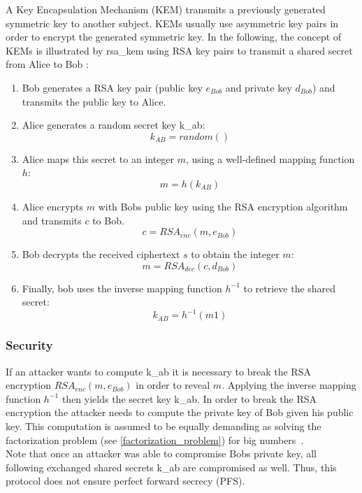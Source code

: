 A Key Encapsulation Mechanism (\gls{KEM}) transmits a previously generated symmetric key to another subject. \glspl{KEM} usually use asymmetric key pairs in order to encrypt the generated symmetric key. In the following, the concept of \glspl{KEM} is illustrated by  \gls{rsa_kem} using \gls{RSA} key pairs to transmit a shared secret from Alice to Bob \parencite{rsakem}:

\begin{enumerate}
\item Bob generates a \gls{RSA} key pair (public key $e_{Bob}$ and private key $d_{Bob}$) and transmits the public key to Alice.
\item Alice generates a random secret key \gls{k_ab}:
\begin{equation*}
k_{AB} = random()
\end{equation*}
\item Alice maps this secret to an integer $m$, using a well-defined mapping function $h$:
\begin{equation*}
m = h(k_{AB})
\end{equation*}
\item Alice encrypts $m$ with Bobs public key using the \gls{RSA} encryption algorithm and transmits $c$ to Bob.
\begin{equation*}
c = RSA_{enc}(m, e_{Bob})
\end{equation*}
\item Bob decrypts the received ciphertext $s$ to obtain the integer $m$:
\begin{equation*}
m = RSA_{dec}(c, d_{Bob})
\end{equation*}
\item Finally, bob uses the inverse mapping function $h^{-1}$ to retrieve the shared secret:
\begin{equation*}
k_{AB} = h^{-1}(m1)
\end{equation*}

\end{enumerate}

\subsubsection{Security}
If an attacker wants to compute \gls{k_ab} it is necessary to break the \gls{RSA} encryption $RSA_{enc}(m, e_{Bob})$ in order to reveal $m$. Applying the inverse mapping function $h^{-1}$ then yields the secret key \gls{k_ab}. In order to break the \gls{RSA} encryption the attacker needs to compute the private key of Bob given his public key. This computation is assumed to be equally demanding as solving the factorization problem (see \autoref{factorization_problem}) for big numbers~\parencite{rsa2005problem}.\\
Note that once an attacker was able to compromise Bobs private key, all following exchanged shared secrets \gls{k_ab} are compromised as well. Thus, this protocol does not ensure perfect forward secrecy (\gls{PFS}).

